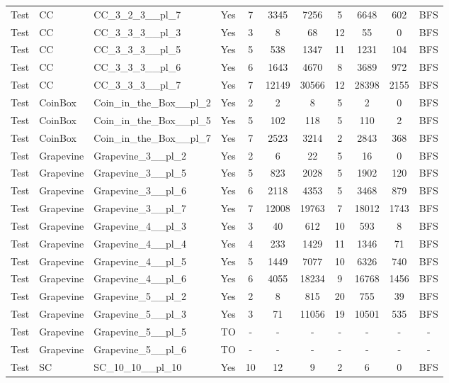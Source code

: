 \documentclass{article}
\begin{document}
\begin{tabular}{lllcccccccc}
Test & CC & CC\_3\_2\_3\_\_pl\_7 & Yes & 7 & 3345 & 7256 & 5 & 6648 & 602 & BFS \\
Test & CC & CC\_3\_3\_3\_\_pl\_3 & Yes & 3 & 8 & 68 & 12 & 55 & 0 & BFS \\
Test & CC & CC\_3\_3\_3\_\_pl\_5 & Yes & 5 & 538 & 1347 & 11 & 1231 & 104 & BFS \\
Test & CC & CC\_3\_3\_3\_\_pl\_6 & Yes & 6 & 1643 & 4670 & 8 & 3689 & 972 & BFS \\
Test & CC & CC\_3\_3\_3\_\_pl\_7 & Yes & 7 & 12149 & 30566 & 12 & 28398 & 2155 & BFS \\
Test & CoinBox & Coin\_in\_the\_Box\_\_pl\_2 & Yes & 2 & 2 & 8 & 5 & 2 & 0 & BFS \\
Test & CoinBox & Coin\_in\_the\_Box\_\_pl\_5 & Yes & 5 & 102 & 118 & 5 & 110 & 2 & BFS \\
Test & CoinBox & Coin\_in\_the\_Box\_\_pl\_7 & Yes & 7 & 2523 & 3214 & 2 & 2843 & 368 & BFS \\
Test & Grapevine & Grapevine\_3\_\_pl\_2 & Yes & 2 & 6 & 22 & 5 & 16 & 0 & BFS \\
Test & Grapevine & Grapevine\_3\_\_pl\_5 & Yes & 5 & 823 & 2028 & 5 & 1902 & 120 & BFS \\
Test & Grapevine & Grapevine\_3\_\_pl\_6 & Yes & 6 & 2118 & 4353 & 5 & 3468 & 879 & BFS \\
Test & Grapevine & Grapevine\_3\_\_pl\_7 & Yes & 7 & 12008 & 19763 & 7 & 18012 & 1743 & BFS \\
Test & Grapevine & Grapevine\_4\_\_pl\_3 & Yes & 3 & 40 & 612 & 10 & 593 & 8 & BFS \\
Test & Grapevine & Grapevine\_4\_\_pl\_4 & Yes & 4 & 233 & 1429 & 11 & 1346 & 71 & BFS \\
Test & Grapevine & Grapevine\_4\_\_pl\_5 & Yes & 5 & 1449 & 7077 & 10 & 6326 & 740 & BFS \\
Test & Grapevine & Grapevine\_4\_\_pl\_6 & Yes & 6 & 4055 & 18234 & 9 & 16768 & 1456 & BFS \\
Test & Grapevine & Grapevine\_5\_\_pl\_2 & Yes & 2 & 8 & 815 & 20 & 755 & 39 & BFS \\
Test & Grapevine & Grapevine\_5\_\_pl\_3 & Yes & 3 & 71 & 11056 & 19 & 10501 & 535 & BFS \\
Test & Grapevine & Grapevine\_5\_\_pl\_5 & TO & - & - & - & - & - & - & - \\
Test & Grapevine & Grapevine\_5\_\_pl\_6 & TO & - & - & - & - & - & - & - \\
Test & SC & SC\_10\_10\_\_pl\_10 & Yes & 10 & 12 & 9 & 2 & 6 & 0 & BFS \\

\end{tabular}
\end{document}
